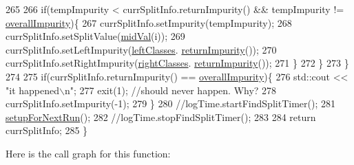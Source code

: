 \begin{DoxyCode}
265 
266                             \textcolor{keywordflow}{if}(tempImpurity < currSplitInfo.returnImpurity() && tempImpurity != 
      \hyperlink{classfp_1_1splitRerF_a4b2291a2bf5d4bd6b7d45b0e7037c5cc}{overallImpurity})\{
267                                 currSplitInfo.setImpurity(tempImpurity);
268                                 currSplitInfo.setSplitValue(\hyperlink{classfp_1_1splitRerF_adf7600843befe65e4a8a34a60f2b5edc}{midVal}(i));
269                                 currSplitInfo.setLeftImpurity(\hyperlink{classfp_1_1splitRerF_aa5aa4856a4bc8e5f0852d8e6fa935cfc}{leftClasses}.
      \hyperlink{classfp_1_1classRerFTotals_afb6ce5c3e6de1bbf33d1ebe225bcecac}{returnImpurity}());
270                                 currSplitInfo.setRightImpurity(\hyperlink{classfp_1_1splitRerF_a8f78d6a0269d046328bead1cbf51be36}{rightClasses}.
      \hyperlink{classfp_1_1classRerFTotals_afb6ce5c3e6de1bbf33d1ebe225bcecac}{returnImpurity}());
271                             \}
272                         \}
273                     \}
274 
275                     \textcolor{keywordflow}{if}(currSplitInfo.returnImpurity() == \hyperlink{classfp_1_1splitRerF_a4b2291a2bf5d4bd6b7d45b0e7037c5cc}{overallImpurity})\{
276                         std::cout << \textcolor{stringliteral}{"it happened\(\backslash\)n"};
277                         exit(1); \textcolor{comment}{//should never happen.  Why?}
278                         currSplitInfo.setImpurity(-1);
279                     \}
280                     \textcolor{comment}{//logTime.startFindSplitTimer();}
281                     \hyperlink{classfp_1_1splitRerF_ac7ee17995ee82e98a092089b5803fd70}{setupForNextRun}();
282                     \textcolor{comment}{//logTime.stopFindSplitTimer();}
283 
284                     \textcolor{keywordflow}{return} currSplitInfo;
285                 \}
\end{DoxyCode}
Here is the call graph for this function\+:
\nopagebreak
